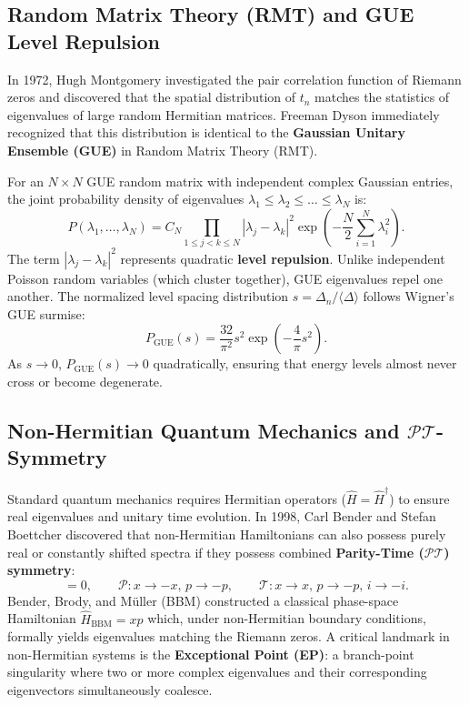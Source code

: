 \documentclass[11pt,a4paper]{article}
\begin{document}
\subsection{Random Matrix Theory (RMT) and GUE Level Repulsion}
In 1972, Hugh Montgomery investigated the pair correlation function of Riemann zeros and discovered that the spatial distribution of $t_n$ matches the statistics of eigenvalues of large random Hermitian matrices. Freeman Dyson immediately recognized that this distribution is identical to the \textbf{Gaussian Unitary Ensemble (GUE)} in Random Matrix Theory (RMT).

For an $N \times N$ GUE random matrix with independent complex Gaussian entries, the joint probability density of eigenvalues $\lambda_1 \le \lambda_2 \le \dots \le \lambda_N$ is:
\begin{equation}
P(\lambda_1, \dots, \lambda_N) = C_N \prod_{1 \le j < k \le N} |\lambda_j - \lambda_k|^2 \exp\left( -\frac{N}{2} \sum_{i=1}^N \lambda_i^2 \right).
\end{equation}
The term $|\lambda_j - \lambda_k|^2$ represents quadratic \textbf{level repulsion}. Unlike independent Poisson random variables (which cluster together), GUE eigenvalues repel one another. The normalized level spacing distribution $s = \Delta_n / \langle \Delta \rangle$ follows Wigner's GUE surmise:
\begin{equation}
P_{\text{GUE}}(s) = \frac{32}{\pi^2} s^2 \exp\left( -\frac{4}{\pi} s^2 \right).
\end{equation}
As $s \to 0$, $P_{\text{GUE}}(s) \to 0$ quadratically, ensuring that energy levels almost never cross or become degenerate.

\subsection{Non-Hermitian Quantum Mechanics and \texorpdfstring{$\mathcal{PT}$}{PT}-Symmetry}
Standard quantum mechanics requires Hermitian operators ($\hat{H} = \hat{H}^\dagger$) to ensure real eigenvalues and unitary time evolution. In 1998, Carl Bender and Stefan Boettcher discovered that non-Hermitian Hamiltonians can also possess purely real or constantly shifted spectra if they possess combined \textbf{Parity-Time ($\mathcal{PT}$) symmetry}:
\begin{equation}
[\mathcal{PT}, \hat{H}] = 0, \qquad \mathcal{P}: x \to -x, \, p \to -p, \qquad \mathcal{T}: x \to x, \, p \to -p, \, i \to -i.
\end{equation}
Bender, Brody, and M\"uller (BBM) constructed a classical phase-space Hamiltonian $\hat{H}_{\text{BBM}} = x p$ which, under non-Hermitian boundary conditions, formally yields eigenvalues matching the Riemann zeros. A critical landmark in non-Hermitian systems is the \textbf{Exceptional Point (EP)}: a branch-point singularity where two or more complex eigenvalues and their corresponding eigenvectors simultaneously coalesce.
\end{document}
